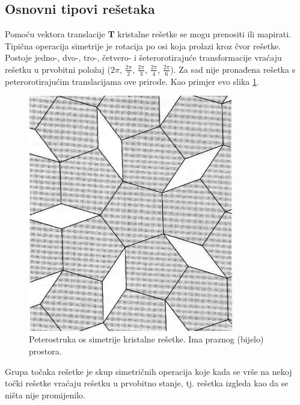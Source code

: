 \documentclass{article}
\numberwithin{equation}{section}
\begin{document}
\newpage
\subsection{Osnovni tipovi rešetaka}
Pomoću vektora translacije \textbf{T} kristalne rešetke se mogu prenositi ili mapirati. Tipična operacija simetrije je rotacija po osi koja prolazi kroz čvor rešetke.  Postoje jedno-, dvo-, tro-, četvero- i šeterorotirajuće transformacije vraćaju rešetku u prvobitni položaj ($2\pi$, $\frac{2\pi}{2}$, $\frac{2\pi}{3}$, $\frac{2\pi}{4}$, $\frac{2\pi}{6}$). Za sad nije pronađena rešetka s peterorotirajućim translacijama ove prirode. Kao primjer evo slika \ref{fig:S3}.
\begin{figure}[h!]
    \centering
    \includegraphics[width=9cm]{Slika_3.PNG}
    \caption{Peterostruka os simetrije kristalne rešetke. Ima praznog (bijelo) prostora.}
    \label{fig:S3}
\end{figure}
Grupa točaka rešetke je skup simetričnih operacija koje kada se vrše na nekoj točki rešetke vraćaju rešetku u prvobitno stanje, tj. rešetka izgleda kao da se ništa nije promijenilo. 
\end{document}
